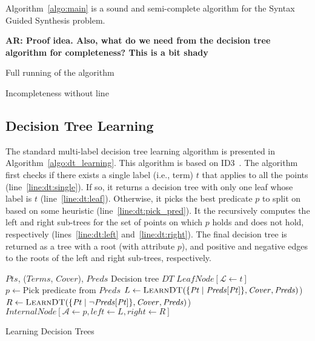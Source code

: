\documentclass{llncs}
\newcommand\arsays[1]{{\bf AR: #1}}
\newcommand\Points{\mathit{Pts}}
\newcommand\Point{\mathit{Pt}}
\newcommand\Predicates{\mathit{Preds}}
\newcommand\Pred{p}
\newcommand\Terms{\mathit{Terms}}
\newcommand\Term{t}
\newcommand\Cover{\mathit{Cover}}
\newcommand\DecisionTree{\mathit{DT}}
\newcommand\Attribute{\mathcal{A}}
\newcommand\Label{\mathcal{L}}
\begin{document}
\begin{theorem}
  Algorithm~\ref{algo:main} is a sound and semi-complete algorithm for the
  Syntax Guided Synthesis problem.
\end{theorem}
\arsays{Proof idea. Also, what do we need from the decision tree
algorithm for completeness? This is a bit shady}

\begin{example}
  Full running of the algorithm
\end{example}

\begin{example}
  Incompleteness without line~\label{line:main:more_preds}
\end{example}

\subsection{Decision Tree Learning}
\label{sec:decision_trees}

The standard multi-label decision tree learning algorithm is presented
in Algorithm~\ref{algo:dt_learning}.
This algorithm is based on ID3~\cite{ID3}.
The algorithm first checks if there exists a single label (i.e., term)
$\Term$ that applies to all the points (line~\ref{line:dt:single}).
If so, it returns a decision tree with only one leaf whose label is
$\Term$ (line~\ref{line:dt:leaf}).
Otherwise, it picks the best predicate $\Pred$ to split on based on some
heuristic (line~\ref{line:dt:pick_pred}).
It the recursively computes the left and right sub-trees for the set of
points on which $\Pred$ holds and does not hold, respectively
(lines~\ref{line:dt:left} and~\ref{line:dt:right}).
The final decision tree is returned as a tree with a root (with
attribute $\Pred$), and positive and negative edges to the roots of the
left and right sub-trees, respectively.

\begin{algorithm}
  \begin{algorithmic}[1]
    \Require $\Points$, ($\Terms$, $\Cover$), $\Predicates$
    \Ensure Decision tree $\DecisionTree$
    \If { $\exists \Term : \Cover[\Terms] \supseteq \Points$ }\label{line:dt:single}
    \Return $\mathit{LeafNode}[\Label \gets \Term]$ \label{line:dt:leaf}
    \EndIf
    \State $\Pred \gets \mbox{Pick predicate from $\Predicates$}$\label{line:dt:pick_pred}
    \State $L \gets \Call{LearnDT}{\{ \Point \mid \Predicates[\Point] \}, \Cover, \Predicates }$\label{line:dt:left})
    \State $R \gets \Call{LearnDT}{\{ \Point \mid \neg \Predicates[\Point] \}, \Cover, \Predicates }$\label{line:dt:right})
    \State \Return $\mathit{InternalNode}[\Attribute \gets \Pred,  left \gets L , right \gets R ]$
  \end{algorithmic}
  \label{algo:dt_learning}
  \caption{Learning Decision Trees}
\end{algorithm}
\end{document}

